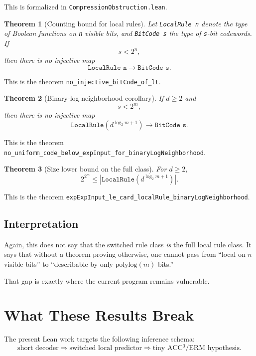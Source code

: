 \documentclass[11pt]{article}
\newtheorem{theorem}{Theorem}[section]
\theoremstyle{remark}
\begin{document}
This is formalized in \texttt{CompressionObstruction.lean}.

\begin{theorem}[Counting bound for local rules]
Let \texttt{LocalRule n} denote the type of Boolean functions on \texttt{n} visible bits, and
\texttt{BitCode s} the type of \texttt{s}-bit codewords.  If
\[
  s < 2^n,
\]
then there is no injective map
\[
  \texttt{LocalRule n} \to \texttt{BitCode s}.
\]
\end{theorem}

\noindent
This is the theorem \texttt{no\_injective\_bitCode\_of\_lt}.

\begin{theorem}[Binary-log neighborhood corollary]
If $d \ge 2$ and
\[
  s < 2^m,
\]
then there is no injective map
\[
  \texttt{LocalRule}\!\left(d^{\log_2 m + 1}\right) \to \texttt{BitCode s}.
\]
\end{theorem}

\noindent
This is the theorem
\texttt{no\_uniform\_code\_below\_expInput\_for\_binaryLogNeighborhood}.

\begin{theorem}[Size lower bound on the full class]
For $d \ge 2$,
\[
  2^{2^m} \le
  \left|\texttt{LocalRule}\!\left(d^{\log_2 m + 1}\right)\right|.
\]
\end{theorem}

\noindent
This is the theorem
\texttt{expExpInput\_le\_card\_localRule\_binaryLogNeighborhood}.

\subsection{Interpretation}

Again, this does not say that the switched rule class \emph{is} the full local rule class.  It says
that without a theorem proving otherwise, one cannot pass from
``local on $n$ visible bits'' to ``describable by only $\mathrm{polylog}(m)$ bits.''

That gap is exactly where the current program remains vulnerable.

\section{What These Results Break}

The present Lean work targets the following inference schema:
\[
  \text{short decoder}
  \Longrightarrow
  \text{switched local predictor}
  \Longrightarrow
  \text{tiny ACC$^0$/ERM hypothesis}.
\]
\end{document}
